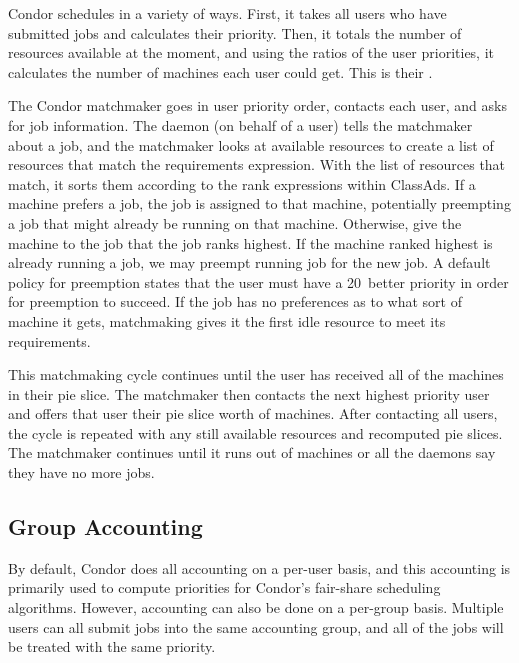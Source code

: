 Condor schedules in a variety of ways.
First, it takes all users who have submitted jobs and calculates their priority.
Then, it totals the number of resources available at the moment,
and using the ratios of the user priorities,
it calculates the number of machines each user could get.
This is their .

The Condor matchmaker goes in user priority order, 
contacts each user, and asks for job information. 
The  daemon (on behalf of a user)
tells the matchmaker about a job,
and the matchmaker looks at available resources
to create a list of resources that match the requirements expression.
With the list of resources that match,
it sorts them according to the rank expressions within ClassAds.
If a machine prefers a job, the job is assigned to that machine,
potentially preempting a job that might already be running on that machine.
Otherwise, give the machine to the job that the job ranks highest.
If the machine ranked highest is already running a job,
we may preempt running job
for the new job. 
A default policy for preemption states that the user must
have a 20\Percent\  better priority in order for preemption to succeed.
If the job has no preferences as to what sort of machine it gets,
matchmaking gives it the first idle resource to meet its requirements.

This matchmaking cycle continues until the user has received all of the
machines in their pie slice.
The matchmaker then contacts the next highest
priority user and offers that user their pie slice worth of machines.
After contacting all users,
the cycle is repeated with any still available resources
and recomputed pie slices.
The matchmaker continues  
until it runs out of machines or all the  daemons
say they have no more jobs. 

\subsection{\label{sec:group-accounting}Group Accounting}

By default, Condor does all accounting on a per-user basis, and this
accounting is primarily used to compute priorities for Condor's
fair-share scheduling algorithms. 
However, accounting can also be done on a per-group basis.
Multiple users can all submit jobs into the same accounting group,
and all of the jobs will be treated with the same priority.

